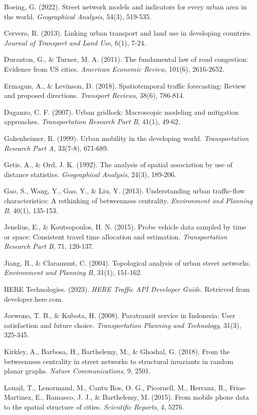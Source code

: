 \documentclass[
  12pt,
]{article}
\begin{document}
Boeing, G. (2022). Street network models and indicators for every urban area in the world. \emph{Geographical Analysis}, 54(3), 519-535.

Cervero, R. (2013). Linking urban transport and land use in developing countries. \emph{Journal of Transport and Land Use}, 6(1), 7-24.

Duranton, G., \& Turner, M. A. (2011). The fundamental law of road congestion: Evidence from US cities. \emph{American Economic Review}, 101(6), 2616-2652.

Ermagun, A., \& Levinson, D. (2018). Spatiotemporal traffic forecasting: Review and proposed directions. \emph{Transport Reviews}, 38(6), 786-814.

Daganzo, C. F. (2007). Urban gridlock: Macroscopic modeling and mitigation approaches. \emph{Transportation Research Part B}, 41(1), 49-62.

Gakenheimer, R. (1999). Urban mobility in the developing world. \emph{Transportation Research Part A}, 33(7-8), 671-689.

Getis, A., \& Ord, J. K. (1992). The analysis of spatial association by use of distance statistics. \emph{Geographical Analysis}, 24(3), 189-206.

Gao, S., Wang, Y., Gao, Y., \& Liu, Y. (2013). Understanding urban traffic-flow characteristics: A rethinking of betweenness centrality. \emph{Environment and Planning B}, 40(1), 135-153.

Jenelius, E., \& Koutsopoulos, H. N. (2015). Probe vehicle data sampled by time or space: Consistent travel time allocation and estimation. \emph{Transportation Research Part B}, 71, 120-137.

Jiang, B., \& Claramunt, C. (2004). Topological analysis of urban street networks. \emph{Environment and Planning B}, 31(1), 151-162.

HERE Technologies. (2023). \emph{HERE Traffic API Developer Guide}. Retrieved from developer.here.com.

Joewono, T. B., \& Kubota, H. (2008). Paratransit service in Indonesia: User satisfaction and future choice. \emph{Transportation Planning and Technology}, 31(3), 325-345.

Kirkley, A., Barbosa, H., Barthelemy, M., \& Ghoshal, G. (2018). From the betweenness centrality in street networks to structural invariants in random planar graphs. \emph{Nature Communications}, 9, 2501.

Louail, T., Lenormand, M., Cantu Ros, O. G., Picornell, M., Herranz, R., Frias-Martinez, E., Ramasco, J. J., \& Barthelemy, M. (2015). From mobile phone data to the spatial structure of cities. \emph{Scientific Reports}, 4, 5276.
\end{document}
